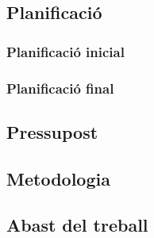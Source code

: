 \documentclass[12pt,a4paper,final,twoside]{article}
\begin{document}
\label{Planificacio}
\subsection{Planificació}


\subsubsection{Planificació inicial}


\subsubsection{Planificació final}


\label{Pressupost}
\subsection{Pressupost}


\label{Metodologia}
\subsection{Metodologia}


\label{Abast}
\subsection{Abast del treball}
\end{document}
